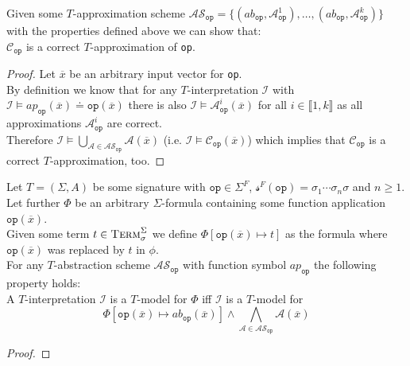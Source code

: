 \begin{lemma}
Given some $T$-approximation scheme 
$\mathcal{AS}_{\texttt{op}} = \{ \left(ab_{\texttt{op}}, \mathcal{A}^1_{\texttt{op}}\right),\dots,\left(ab_{\texttt{op}}, \mathcal{A}^k_{\texttt{op}}\right) \}$
with the properties defined above we can show that:\\
$\mathcal{C}_{\texttt{op}}$ is a correct $T$-approximation of \texttt{op}.
\begin{proof}
Let $\overline{x}$ be an arbitrary input vector for \texttt{op}.\\
By definition we know that for any $T$-interpretation $\mathcal{I}$ with $\mathcal{I} \vDash ap_{\texttt{op}}\left(\overline{x}\right) \doteq \texttt{op}\left(\overline{x}\right)$ there is also $\mathcal{I} \vDash \mathcal{A}^i_{\texttt{op}}\left(\overline{x}\right)$ for all $i\in\llbracket1,k\rrbracket$ as all approximations $\mathcal{A}^i_{\texttt{op}}$ are correct.\\
Therefore $\mathcal{I} \vDash \bigcup\limits_{\mathcal{A}\in\mathcal{AS}_{\texttt{op}}} \mathcal{A}\left(\overline{x}\right)$ (i.e. $\mathcal{I} \vDash \mathcal{C}_{\texttt{op}}\left(\overline{x}\right)$) which implies that $\mathcal{C}_{\texttt{op}}$ is a correct $T$-approximation, too.
\end{proof}
\end{lemma}

\begin{lemma}
\end{lemma}

\begin{theorem}
\label{theorem:abstractions:scheme:equivalence}
Let $T=\left(\Sigma,A\right)$ be some signature with $\texttt{op}\in\Sigma^F$, $\mathcal{s}^F\left(\texttt{op}\right)=\sigma_1\dotsi\sigma_n\sigma$ and $n\geq1$.\\
Let further $\Phi$ be an arbitrary $\Sigma$-formula containing some function application $\texttt{op}\left(\overline{x}\right)$.\\
Given some term $t\in\textsc{Term}_\sigma^\Sigma$ we define $\Phi\left[\texttt{op}\left(\overline{x}\right)\mapsto t \right]$ as the formula where $\texttt{op}\left(\overline{x}\right)$ was replaced by $t$ in $\phi$.\\
For any $T$-abstraction scheme $\mathcal{AS}_{\texttt{op}}$ with function symbol $ap_{\texttt{op}}$ the following property holds:\\
A $T$-interpretation $\mathcal{I}$ is a $T$-model for $\Phi$ iff $\mathcal{I}$ is a $T$-model for 
\[
\Phi\left[ \texttt{op}\left(\overline{x}\right) \mapsto ab_{\texttt{op}}\left(\overline{x}\right) \right] \land \bigwedge\limits_{\mathcal{A}\in\mathcal{AS}_{\texttt{op}}} \mathcal{A}\left(\overline{x}\right)
\]
\begin{proof}
\end{proof}
\end{theorem}

